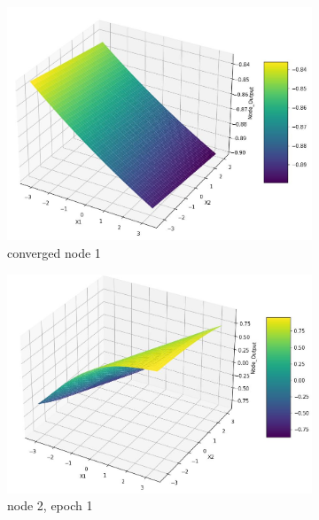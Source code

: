 \documentclass[11pt]{article}
\begin{document}
\begin{figure}[h]
\begin{subfigure}[b]{0.18\textwidth}
	\includegraphics[scale=0.14]{hidden1_n1_c.jpg}
	\caption{converged node 1}
	\label{fig:fig2.1.4.5}
	\end{subfigure}
	\begin{subfigure}[b]{0.18\textwidth}
	\centering
	\includegraphics[scale=0.14]{hidden1_n2_e1.jpg}
	\caption{node 2, epoch 1}
	\label{fig:fig2.1.4.6}
	\end{subfigure}
	\begin{subfigure}[b]{0.18\textwidth}
	\centering

\end{subfigure}
\end{figure}
\end{document}
